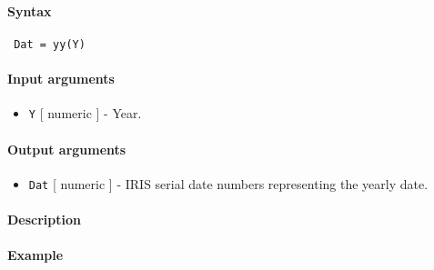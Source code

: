 


	\paragraph{Syntax}
 
 \begin{verbatim}
 Dat = yy(Y)
 \end{verbatim}
 
 \paragraph{Input arguments}
 
 \begin{itemize}
 \item
   \texttt{Y} {[} numeric {]} - Year.
 \end{itemize}
 
 \paragraph{Output arguments}
 
 \begin{itemize}
 \item
   \texttt{Dat} {[} numeric {]} - IRIS serial date numbers representing
   the yearly date.
 \end{itemize}
 
 \paragraph{Description}
 
 \paragraph{Example}


